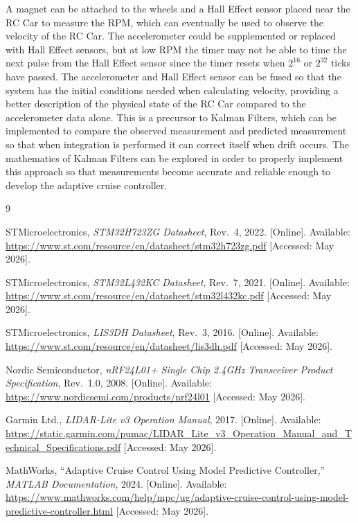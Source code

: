 \documentclass[conference]{IEEEtran}
\begin{document}
	A magnet can be attached to the wheels and a Hall Effect sensor placed near the
	RC Car to measure the RPM, which can eventually be used to observe the velocity
	of the RC Car. The accelerometer could be supplemented or replaced with Hall
	Effect sensors, but at low RPM the timer may not be able to time the next pulse
	from the Hall Effect sensor since the timer resets when $2^{16}$ or $2^{32}$
	ticks have passed. The accelerometer and Hall Effect sensor can be fused so
	that the system has the initial conditions needed when calculating velocity,
	providing a better description of the physical state of the RC Car compared to
	the accelerometer data alone. This is a precursor to Kalman Filters, which can
	be implemented to compare the observed measurement and predicted measurement so
	that when integration is performed it can correct itself when drift occurs. The
	mathematics of Kalman Filters can be explored in order to properly implement
	this approach so that measurements become accurate and reliable enough to
	develop the adaptive cruise controller.
	
	\begin{thebibliography}{9}
		
		STMicroelectronics, \textit{STM32H723ZG Datasheet}, Rev.~4, 2022. [Online].
		Available: \url{https://www.st.com/resource/en/datasheet/stm32h723zg.pdf}
		[Accessed: May 2026].
		
		STMicroelectronics, \textit{STM32L432KC Datasheet}, Rev.~7, 2021. [Online].
		Available: \url{https://www.st.com/resource/en/datasheet/stm32l432kc.pdf}
		[Accessed: May 2026].
		
		STMicroelectronics, \textit{LIS3DH Datasheet}, Rev.~3, 2016. [Online]. 
		Available: \url{https://www.st.com/resource/en/datasheet/lis3dh.pdf}
		[Accessed: May 2026].
		
		Nordic Semiconductor, \textit{nRF24L01+ Single Chip 2.4GHz Transceiver 
			Product Specification}, Rev.~1.0, 2008. [Online]. Available:
		\url{https://www.nordicsemi.com/products/nrf24l01}
		[Accessed: May 2026].
		
		Garmin Ltd., \textit{LIDAR-Lite v3 Operation Manual}, 2017. [Online].
		Available: \url{https://static.garmin.com/pumac/LIDAR_Lite_v3_Operation_Manual_and_Technical_Specifications.pdf}
		[Accessed: May 2026].
		
		MathWorks, ``Adaptive Cruise Control Using Model Predictive Controller,''
		\textit{MATLAB Documentation}, 2024. [Online]. Available:
		\url{https://www.mathworks.com/help/mpc/ug/adaptive-cruise-control-using-model-predictive-controller.html}
		[Accessed: May 2026].
		
	\end{thebibliography}
	
\end{document}
